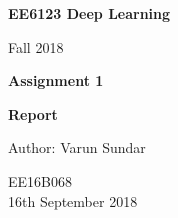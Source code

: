 \begin{titlepage}
    \begin{center}
        \vspace*{1cm}
        
        \Huge
          \textbf{EE6123 Deep Learning}
        
        \vspace{0.5cm}
        \LARGE
        Fall 2018
        
        \vspace{1.5cm}
        
        \textbf{Assignment 1}
   		  \vspace{1.5cm}
        
        \textbf{Report}
       
        \vfill
        
        Author: Varun Sundar
        
        \vspace{0.8cm}
          \Large
        EE16B068 \\
        \vspace{0.5cm}
       16th September 2018
        
    \end{center}
\end{titlepage}